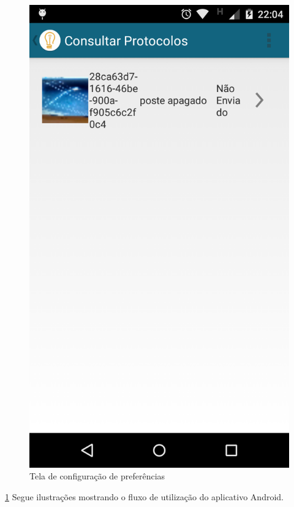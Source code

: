 \documentclass[
	article,			%
	11pt,				%
	oneside,			%
	a4paper,			%
	english,			%
	brazil,				%
	sumario=tradicional
	]{abntex2}
\begin{document}
\begin{figure}[!htbp]
 \centering
  \begin{minipage}{0.4\textwidth}
    \centering
    \caption{\label{android-tela-preferencias}Tela de configuração de preferências}
    \includegraphics[scale=0.1]{android/7.png}
  \end{minipage}
\end{figure}

\ref{android-tela-preferencias}
Segue ilustrações mostrando o fluxo de utilização do aplicativo Android.
\end{document}
